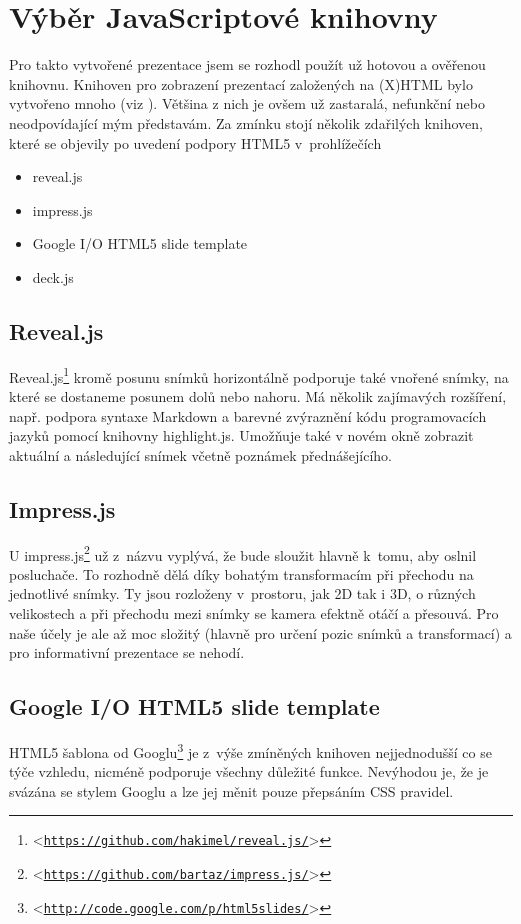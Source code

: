 \documentclass[11pt,twoside,a4paper]{book}
\let\oldUrl\url									%
\renewcommand\url[1]{<\texttt{\oldUrl{#1}}>}
\begin{document}
\section{Výběr JavaScriptové knihovny}
Pro takto vytvořené prezentace jsem se rozhodl použít už hotovou a ověřenou knihovnu. Knihoven pro zobrazení prezentací založených na (X)HTML bylo vytvořeno mnoho (viz \cite{htmlslideshowweb}). Většina z nich je ovšem už zastaralá, nefunkční nebo neodpovídající mým představám. Za zmínku stojí několik zdařilých knihoven, které se objevily po uvedení podpory HTML5 v~prohlížečích

\begin{itemize}
\item reveal.js
\item impress.js
\item Google I/O HTML5 slide template
\item deck.js
\end{itemize}

\subsection{Reveal.js}
Reveal.js\footnote{\url{https://github.com/hakimel/reveal.js/}} kromě posunu snímků horizontálně podporuje také vnořené snímky, na které se dostaneme posunem dolů nebo nahoru. Má několik zajímavých rozšíření, např. podpora syntaxe Markdown a barevné zvýraznění kódu programovacích jazyků pomocí knihovny highlight.js. Umožňuje také v novém okně zobrazit aktuální a následující snímek včetně poznámek přednášejícího.

\subsection{Impress.js}
U impress.js\footnote{\url{https://github.com/bartaz/impress.js/}} už z~názvu vyplývá, že bude sloužit hlavně k~tomu, aby oslnil posluchače. To rozhodně dělá díky bohatým transformacím při přechodu na jednotlivé snímky. Ty jsou rozloženy v~prostoru, jak 2D tak i 3D, o různých velikostech a při přechodu mezi snímky se kamera efektně otáčí a přesouvá. Pro naše účely je ale až moc složitý (hlavně pro určení pozic snímků a transformací) a pro informativní prezentace se nehodí.

\subsection{Google I/O HTML5 slide template}
HTML5 šablona od Googlu\footnote{\url{http://code.google.com/p/html5slides/}} je z~výše zmíněných knihoven nejjednodušší co se týče vzhledu, nicméně podporuje všechny
důležité funkce. Nevýhodou je, že je svázána se stylem Googlu a lze jej měnit pouze přepsáním CSS pravidel.
\end{document}
